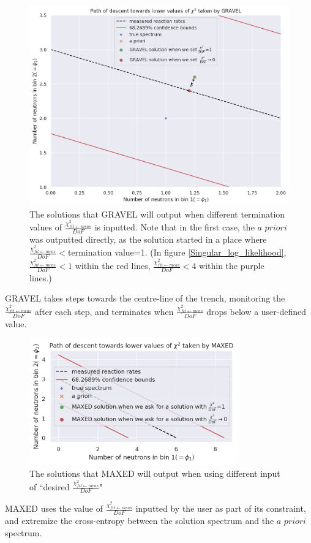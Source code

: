 \documentclass[a4paper, 12pt]{article}
\newcommand{\apriori}{\textit{a priori}}
\newcommand{\chifit}{\frac{\chi^2_{fit\leftarrow meas}}{DoF} }
\begin{document}
\begin{figure}[H]
\centering
\includegraphics[width=\textwidth]{GRAVEL_descent.png}
\caption{The solutions that GRAVEL will output when different termination values of $\chifit$ is inputted. Note that in the first case, the $\apriori$ was outputted directly, as the solution started in a place where $\chifit<$termination value=1.
(In figure \ref{Singular_log_likelihood}, $\chifit<1$ within the red lines, $\chifit<4$ within the purple lines.)
}\label{GRAVEL path of descent}
\end{figure}
GRAVEL takes steps towards the centre-line of the trench, monitoring the $\chifit$ after each step, and terminates when $\chifit$ drops below a user-defined value.
\begin{figure}[H]
\centering
\includegraphics[width=0.8\textwidth]{MAXED_descent.png}
\caption{The solutions that MAXED will output when using different input of ``desired $\chifit$"}\label{MAXED path of descent}
\end{figure}
MAXED uses the value of $\chifit$ inputted by the user as part of its constraint, and extremize the cross-entropy between the solution spectrum and the $\apriori$ spectrum.
\end{document}
